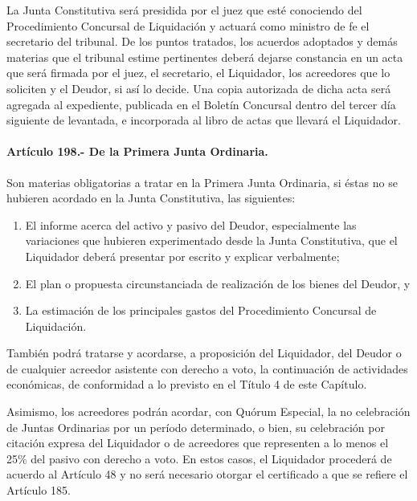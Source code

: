 \documentclass[
]{book}
\begin{document}
La Junta Constitutiva será presidida por el juez que esté conociendo del Procedimiento Concursal de Liquidación y actuará como ministro de fe el secretario del tribunal. De los puntos tratados, los acuerdos adoptados y demás materias que el tribunal estime pertinentes deberá dejarse constancia en un acta que será firmada por el juez, el secretario, el Liquidador, los acreedores que lo soliciten y el Deudor, si así lo decide. Una copia autorizada de dicha acta será agregada al expediente, publicada en el Boletín Concursal dentro del tercer día siguiente de levantada, e incorporada al libro de actas que llevará el Liquidador.

\hypertarget{artuxedculo-198.--de-la-primera-junta-ordinaria.}{%
\paragraph*{Artículo 198.- De la Primera Junta Ordinaria.}\label{artuxedculo-198.--de-la-primera-junta-ordinaria.}}

Son materias obligatorias a tratar en la Primera Junta Ordinaria, si éstas no se hubieren acordado en la Junta Constitutiva, las siguientes:

\begin{enumerate}
\def\labelenumi{\arabic{enumi})}
\item
  El informe acerca del activo y pasivo del Deudor, especialmente las variaciones que hubieren experimentado desde la Junta Constitutiva, que el Liquidador deberá presentar por escrito y explicar verbalmente;
\item
  El plan o propuesta circunstanciada de realización de los bienes del Deudor, y
\item
  La estimación de los principales gastos del Procedimiento Concursal de Liquidación.
\end{enumerate}

También podrá tratarse y acordarse, a proposición del Liquidador, del Deudor o de cualquier acreedor asistente con derecho a voto, la continuación de actividades económicas, de conformidad a lo previsto en el Título 4 de este Capítulo.

Asimismo, los acreedores podrán acordar, con Quórum Especial, la no celebración de Juntas Ordinarias por un período determinado, o bien, su celebración por citación expresa del Liquidador o de acreedores que representen a lo menos el 25\% del pasivo con derecho a voto. En estos casos, el Liquidador procederá de acuerdo al Artículo 48 y no será necesario otorgar el certificado a que se refiere el Artículo 185.
\end{document}
